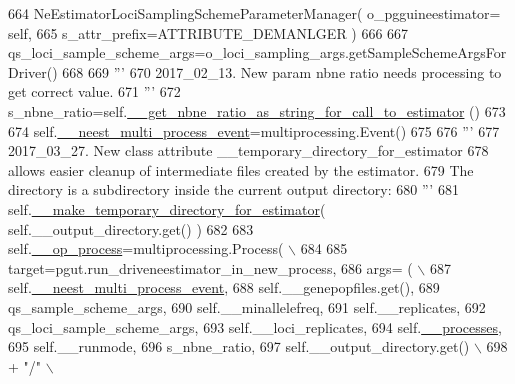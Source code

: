 \begin{DoxyCode}
664                 NeEstimatorLociSamplingSchemeParameterManager( o\_pgguineestimator= self,
665                                                                 s\_attr\_prefix=ATTRIBUTE\_DEMANLGER )
666 
667         qs\_loci\_sample\_scheme\_args=o\_loci\_sampling\_args.getSampleSchemeArgsForDriver()
668 
669         \textcolor{stringliteral}{'''}
670 \textcolor{stringliteral}{        2017\_02\_13. New param nbne ratio needs processing to get correct value.}
671 \textcolor{stringliteral}{        '''}
672         s\_nbne\_ratio=self.\hyperlink{classnegui_1_1temp_1_1PGGuiNeEstimator_af434f4bea8e240442abe45eb66b28879}{\_\_get\_nbne\_ratio\_as\_string\_for\_call\_to\_estimator}
      ()
673 
674         self.\hyperlink{classnegui_1_1temp_1_1PGGuiNeEstimator_a5057ab14b559e8de7dd5354bc828717f}{\_\_neest\_multi\_process\_event}=multiprocessing.Event()
675 
676         \textcolor{stringliteral}{'''}
677 \textcolor{stringliteral}{        2017\_03\_27.  New class attribute \_\_temporary\_directory\_for\_estimator}
678 \textcolor{stringliteral}{        allows easier cleanup of intermediate files created by the estimator.}
679 \textcolor{stringliteral}{        The directory is a subdirectory inside the current output directory:}
680 \textcolor{stringliteral}{        '''}
681         self.\hyperlink{classnegui_1_1temp_1_1PGGuiNeEstimator_ac563232551f59f69109593f5504c2bba}{\_\_make\_temporary\_directory\_for\_estimator}( 
      self.\_\_output\_directory.get() )
682 
683         self.\hyperlink{classnegui_1_1temp_1_1PGGuiNeEstimator_a48f5095f58f1b18c94d206b2fb1e0b47}{\_\_op\_process}=multiprocessing.Process( \(\backslash\)
684 
685                 target=pgut.run\_driveneestimator\_in\_new\_process,
686                     args= ( \(\backslash\)
687                             self.\hyperlink{classnegui_1_1temp_1_1PGGuiNeEstimator_a5057ab14b559e8de7dd5354bc828717f}{\_\_neest\_multi\_process\_event},
688                             self.\_\_genepopfiles.get(),
689                             qs\_sample\_scheme\_args,
690                             self.\_\_minallelefreq,
691                             self.\_\_replicates,
692                             qs\_loci\_sample\_scheme\_args,
693                             self.\_\_loci\_replicates,
694                             self.\hyperlink{classnegui_1_1temp_1_1PGGuiNeEstimator_a9bdde8c3fe94514d1266ef4c7882727c}{\_\_processes},
695                             self.\_\_runmode,
696                             s\_nbne\_ratio,
697                             self.\_\_output\_directory.get() \(\backslash\)
698                                     + \textcolor{stringliteral}{"/"} \(\backslash\)

\end{DoxyCode}
